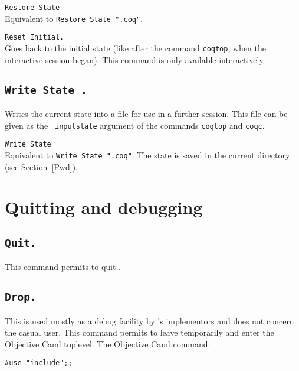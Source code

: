 \begin{Variants}
\item {\tt Restore State \ident}\\
 Equivalent to {\tt Restore State "}{\ident}{\tt .coq"}.
\item {\tt Reset Initial.}\\ 
  Goes back to the initial state (like after the command {\tt coqtop},
  when the interactive session began). This command is only available
  interactively.
\end{Variants}

\subsection[\tt Write State \str.]{\tt Write State \str.}
Writes the current state into a file \str{} for
use in a further session. This file can be given as the {\tt
  inputstate} argument of the commands {\tt coqtop} and {\tt coqc}.

\begin{Variants}
\item {\tt Write State \ident}\\
 Equivalent to {\tt Write State "}{\ident}{\tt .coq"}.
 The state is saved in the current directory (see Section~\ref{Pwd}).
\end{Variants}

\section{Quitting and debugging}

\subsection[\tt Quit.]{\tt Quit.}
This command permits to quit \Coq.

\subsection[\tt Drop.]{\tt Drop.\label{Drop}}

This is used mostly as a debug facility by \Coq's implementors
and does not concern the casual user.
This command permits to leave {\Coq} temporarily and enter the
Objective Caml toplevel. The Objective Caml command:

\begin{flushleft}
\begin{verbatim}
#use "include";;
\end{verbatim}
\end{flushleft}

